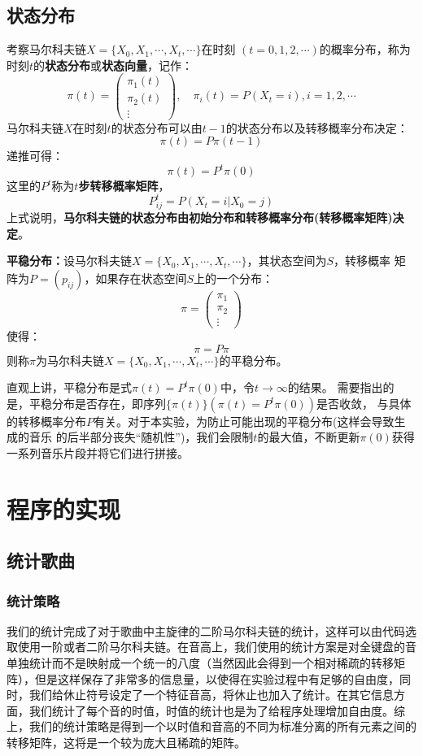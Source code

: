 \documentclass[12pt, a4paper, oneside]{ctexart}
\begin{document}
	\subsection{状态分布}
	考察马尔科夫链$X=\{X_0,X_1,\cdots,X_t,\cdots \}$在时刻
	$(t=0,1,2,\cdots)$的概率分布，称为时刻$t$的\textbf{状态分布}或\textbf{状态向量}，记作：
	$$ \pi(t)= \begin{pmatrix}
		\pi_1(t)\\\pi_2(t)\\\vdots
	\end{pmatrix} ,\quad \pi_i(t)=P(X_t=i),i=1,2,\cdots $$
	马尔科夫链$X$在时刻$t$的状态分布可以由$t-1$的状态分布以及转移概率分布决定：
	$$\pi(t)=P\pi(t-1)$$
	递推可得：
	$$\pi(t)=P^t\pi(0)$$
	这里的$P^t$称为\textbf{$t$步转移概率矩阵}，
	$$P^t_{ij}=P(X_t=i|X_0=j)$$
	上式说明，\textbf{马尔科夫链的状态分布由初始分布和转移概率分布(转移概率矩阵)决定}。\par 
	\vspace*{1em}
	\textbf{平稳分布：}设马尔科夫链$X=\{X_0,X_1,\cdots,X_t,\cdots \}$，其状态空间为$S$，转移概率
	矩阵为$P=(p_{ij})$，如果存在状态空间$S$上的一个分布：
	$$\pi= \begin{pmatrix}
		\pi_1\\\pi_2\\\vdots
	\end{pmatrix}$$
	使得：
	$$\pi = P\pi$$
	则称$\pi$为马尔科夫链$X=\{X_0,X_1,\cdots,X_t,\cdots \}$的平稳分布。\par 
	直观上讲，平稳分布是式$\pi(t)=P^t\pi(0)$中，令$t\rightarrow \infty$的结果。
	需要指出的是，平稳分布是否存在，即序列$\{\pi(t)\}(\pi(t)=P^t\pi(0))$是否收敛，
	与具体的转移概率分布$P$有关。对于本实验，为防止可能出现的平稳分布(这样会导致生成的音乐
	的后半部分丧失“随机性”)，我们会限制$t$的最大值，不断更新$\pi(0)$获得一系列音乐片段并将它们进行拼接。
	
	\section{程序的实现}
	
	\subsection{统计歌曲}
	\subsubsection{统计策略}
	我们的统计完成了对于歌曲中主旋律的二阶马尔科夫链的统计，这样可以由代码选取使用一阶或者二阶马尔科夫链。在音高上，我们使用的统计方案是对全键盘的音单独统计而不是映射成一个统一的八度（当然因此会得到一个相对稀疏的转移矩阵），但是这样保存了非常多的信息量，以使得在实验过程中有足够的自由度，同时，我们给休止符号设定了一个特征音高，将休止也加入了统计。在其它信息方面，我们统计了每个音的时值，时值的统计也是为了给程序处理增加自由度。综上，我们的统计策略是得到一个以时值和音高的不同为标准分离的所有元素之间的转移矩阵，这将是一个较为庞大且稀疏的矩阵。
	
\end{document}
